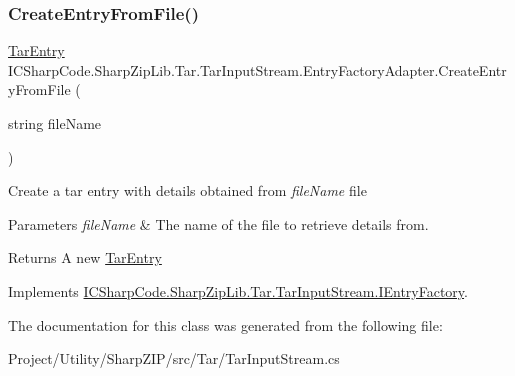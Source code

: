 \subsubsection{\texorpdfstring{Create\+Entry\+From\+File()}{CreateEntryFromFile()}}
{\footnotesize\ttfamily \hyperlink{class_i_c_sharp_code_1_1_sharp_zip_lib_1_1_tar_1_1_tar_entry}{Tar\+Entry} I\+C\+Sharp\+Code.\+Sharp\+Zip\+Lib.\+Tar.\+Tar\+Input\+Stream.\+Entry\+Factory\+Adapter.\+Create\+Entry\+From\+File (\begin{DoxyParamCaption}\item[{string}]{file\+Name }\end{DoxyParamCaption})\hspace{0.3cm}{\ttfamily [inline]}}



Create a tar entry with details obtained from {\itshape file\+Name} file 


\begin{DoxyParams}{Parameters}
{\em file\+Name} & The name of the file to retrieve details from.\\
\hline
\end{DoxyParams}
\begin{DoxyReturn}{Returns}
A new \hyperlink{class_i_c_sharp_code_1_1_sharp_zip_lib_1_1_tar_1_1_tar_entry}{Tar\+Entry}
\end{DoxyReturn}


Implements \hyperlink{interface_i_c_sharp_code_1_1_sharp_zip_lib_1_1_tar_1_1_tar_input_stream_1_1_i_entry_factory_a65fd272011cf65d0e43b9be928edab73}{I\+C\+Sharp\+Code.\+Sharp\+Zip\+Lib.\+Tar.\+Tar\+Input\+Stream.\+I\+Entry\+Factory}.



The documentation for this class was generated from the following file\+:\begin{DoxyCompactItemize}
\item 
Project/\+Utility/\+Sharp\+Z\+I\+P/src/\+Tar/Tar\+Input\+Stream.\+cs\end{DoxyCompactItemize}
